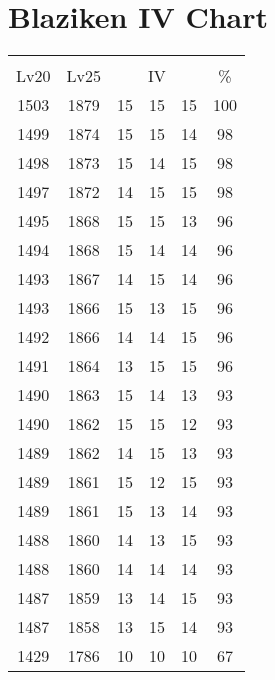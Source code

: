 \documentclass{article}%
\begin{document}
%
\normalsize%
\section{Blaziken IV Chart}%
\label{sec:Blaziken IV Chart}%
\renewcommand{\arraystretch}{1.5}%
\begin{tabular}{|c|c|c|c|c|c|}%
\hline%
\multicolumn{6}{|c|}{\textcolor{white}{ 
\linebreak{Blaziken}
}%
\cellcolor{black}}\\%
\multicolumn{1}{|c}{Lv20}&\multicolumn{1}{c|}{Lv25}&\multicolumn{3}{c|}{IV}&\multicolumn{1}{|c|}{\%}\\%
\hline%
\rowcolor{color100}%
1503&1879&15&15&15&100\\%
\hline%
\rowcolor{color98}%
1499&1874&15&15&14&98\\%
\hline%
\rowcolor{color98}%
1498&1873&15&14&15&98\\%
\hline%
\rowcolor{color98}%
1497&1872&14&15&15&98\\%
\hline%
\rowcolor{color96}%
1495&1868&15&15&13&96\\%
\hline%
\rowcolor{color96}%
1494&1868&15&14&14&96\\%
\hline%
\rowcolor{color96}%
1493&1867&14&15&14&96\\%
\hline%
\rowcolor{color96}%
1493&1866&15&13&15&96\\%
\hline%
\rowcolor{color96}%
1492&1866&14&14&15&96\\%
\hline%
\rowcolor{color96}%
1491&1864&13&15&15&96\\%
\hline%
\rowcolor{color93}%
1490&1863&15&14&13&93\\%
\hline%
\rowcolor{color93}%
1490&1862&15&15&12&93\\%
\hline%
\rowcolor{color93}%
1489&1862&14&15&13&93\\%
\hline%
\rowcolor{color93}%
1489&1861&15&12&15&93\\%
\hline%
\rowcolor{color93}%
1489&1861&15&13&14&93\\%
\hline%
\rowcolor{color93}%
1488&1860&14&13&15&93\\%
\hline%
\rowcolor{color93}%
1488&1860&14&14&14&93\\%
\hline%
\rowcolor{color93}%
1487&1859&13&14&15&93\\%
\hline%
\rowcolor{color93}%
1487&1858&13&15&14&93\\%
\hline%
\rowcolor{color91}%
1429&1786&10&10&10&67\\%
\end{tabular}

%
\end{document}
